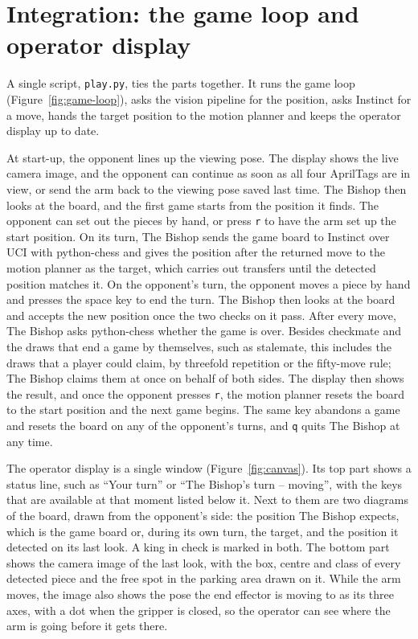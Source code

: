 \section{Integration: the game loop and operator display}
\label{sec:integration}

A single script, \texttt{play.py}, ties the parts together.
It runs the game loop (Figure~\ref{fig:game-loop}), asks the vision pipeline for the position, asks Instinct for a move, hands the target position to the motion planner and keeps the operator display up to date.

At start-up, the opponent lines up the viewing pose.
The display shows the live camera image, and the opponent can continue as soon as all four AprilTags are in view, or send the arm back to the viewing pose saved last time.
The Bishop then looks at the board, and the first game starts from the position it finds.
The opponent can set out the pieces by hand, or press \texttt{r} to have the arm set up the start position.
On its turn, The Bishop sends the game board to Instinct over \ac{UCI} with python-chess and gives the position after the returned move to the motion planner as the target, which carries out transfers until the detected position matches it.
On the opponent's turn, the opponent moves a piece by hand and presses the space key to end the turn.
The Bishop then looks at the board and accepts the new position once the two checks on it pass.
After every move, The Bishop asks python-chess whether the game is over.
Besides checkmate and the draws that end a game by themselves, such as stalemate, this includes the draws that a player could claim, by threefold repetition or the fifty-move rule; The Bishop claims them at once on behalf of both sides.
The display then shows the result, and once the opponent presses \texttt{r}, the motion planner resets the board to the start position and the next game begins.
The same key abandons a game and resets the board on any of the opponent's turns, and \texttt{q} quits The Bishop at any time.

The operator display is a single window (Figure~\ref{fig:canvas}).
Its top part shows a status line, such as ``Your turn'' or ``The Bishop's turn -- moving'', with the keys that are available at that moment listed below it.
Next to them are two diagrams of the board, drawn from the opponent's side: the position The Bishop expects, which is the game board or, during its own turn, the target, and the position it detected on its last look.
A king in check is marked in both.
The bottom part shows the camera image of the last look, with the box, centre and class of every detected piece and the free spot in the parking area drawn on it.
While the arm moves, the image also shows the pose the end effector is moving to as its three axes, with a dot when the gripper is closed, so the operator can see where the arm is going before it gets there.

